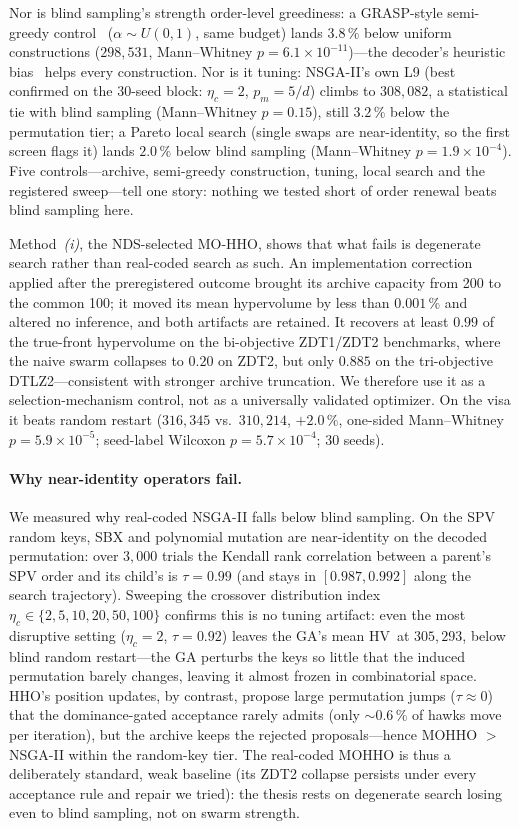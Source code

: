 \documentclass[runningheads]{llncs}
\newcommand{\HV}{\textsf{HV}}
\begin{document}
Nor is blind sampling's strength order-level greediness: a GRASP-style semi-greedy control~\cite{feo} ($\alpha\sim U(0,1)$, same budget) lands $3.8\,\%$ below uniform constructions ($298{,}531$, Mann--Whitney $p=6.1\times10^{-11}$)---the decoder's heuristic bias~\cite{raidl} helps every construction. Nor is it tuning: NSGA-II's own L9 (best confirmed on the 30-seed block: $\eta_c{=}2$, $p_m{=}5/d$) climbs to $308{,}082$, a statistical tie with blind sampling (Mann--Whitney $p=0.15$), still $3.2\,\%$ below the permutation tier; a Pareto local search (single swaps are near-identity, so the first screen flags it) lands $2.0\,\%$ below blind sampling (Mann--Whitney $p=1.9\times10^{-4}$). Five controls---archive, semi-greedy construction, tuning, local search and the registered sweep---tell one story: nothing we tested short of order renewal beats blind sampling here.

Method~\emph{(i)}, the NDS-selected MO-HHO, shows that what fails is degenerate search rather than real-coded search as such. An implementation correction applied after the preregistered outcome brought its archive capacity from 200 to the common 100; it moved its mean hypervolume by less than $0.001\,\%$ and altered no inference, and both artifacts are retained. It recovers at least $0.99$ of the true-front hypervolume on the bi-objective ZDT1/ZDT2 benchmarks, where the naive swarm collapses to $0.20$ on ZDT2, but only $0.885$ on the tri-objective DTLZ2---consistent with stronger archive truncation. We therefore use it as a selection-mechanism control, not as a universally validated optimizer. On the visa it beats random restart ($316{,}345$ vs.\ $310{,}214$, $+2.0\,\%$, one-sided Mann--Whitney $p=5.9\times10^{-5}$; seed-label Wilcoxon $p=5.7\times10^{-4}$; 30 seeds).

\paragraph{Why near-identity operators fail.}
We measured why real-coded NSGA-II falls below blind sampling. On the SPV random keys, SBX and polynomial mutation are near-identity on the decoded permutation: over $3{,}000$ trials the Kendall rank correlation between a parent's SPV order and its child's is $\tau=0.99$ (and stays in $[0.987,0.992]$ along the search trajectory). Sweeping the crossover distribution index $\eta_c\in\{2,5,10,20,50,100\}$ confirms this is no tuning artifact: even the most disruptive setting ($\eta_c{=}2$, $\tau{=}0.92$) leaves the GA's mean \HV\ at $305{,}293$, below blind random restart---the GA perturbs the keys so little that the induced permutation barely changes, leaving it almost frozen in combinatorial space. HHO's position updates, by contrast, propose large permutation jumps ($\tau\approx0$) that the dominance-gated acceptance rarely admits (only ${\sim}0.6\,\%$ of hawks move per iteration), but the archive keeps the rejected proposals---hence MOHHO $>$ NSGA-II within the random-key tier. The real-coded MOHHO is thus a deliberately standard, weak baseline (its ZDT2 collapse persists under every acceptance rule and repair we tried): the thesis rests on degenerate search losing even to blind sampling, not on swarm strength.
\end{document}
